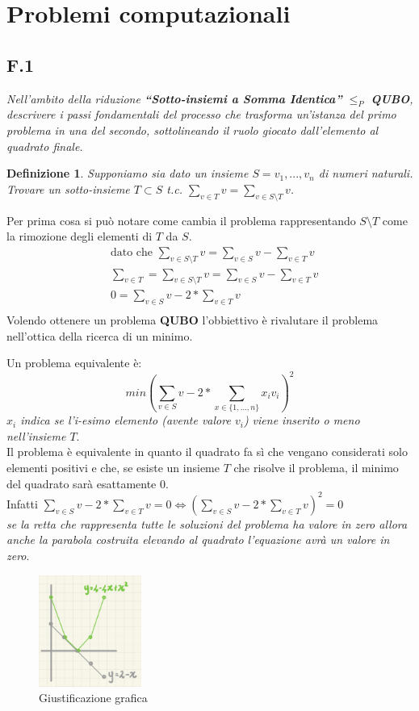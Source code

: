 \documentclass[a4paper]{article}
\newtheorem*{definition}{Definizione}
\begin{document}
\section{Problemi computazionali}
\subsection{F.1}
\label{SEC:F1}
\emph{Nell’ambito della riduzione \textbf{“Sotto-insiemi a Somma Identica”} $\leq_P$ \textbf{QUBO}, descrivere i passi fondamentali del processo che trasforma un’istanza del primo problema in una del secondo, sottolineando il ruolo giocato dall’elemento al quadrato finale.}

\begin{definition}
	Supponiamo sia dato un insieme $S = {v_1 , . . . , v_n }$ di numeri naturali. Trovare un sotto-insieme $T \subset S$ t.c.  $\sum_{v\in T} v = \sum_{v \in S \setminus T}v $.
\end{definition}
Per prima cosa si può notare come cambia il problema rappresentando $S \setminus T$ come la rimozione degli elementi di $T$ da $S$.
\begin{align*}
	 &\text{dato che }\sum_{v \in S \setminus T}v = \sum_{v\in S} v - \sum_{v\in T} v \\
	 &\sum_{v\in T} = \sum_{v \in S \setminus T}v = \sum_{v\in S} v - \sum_{v\in T} v \\
	 &0 = \sum_{v\in S} v - 2 * \sum_{v\in T} v \\
\end{align*}
Volendo ottenere un problema \textbf{QUBO} l'obbiettivo è rivalutare il problema nell'ottica della ricerca di un minimo.

Un problema equivalente è: $$ min(\sum_{v\in S} v - 2 * \sum_{x \in \{1,...,n\}} x_iv_i)^2$$ \textit{$x_i$ indica se l'i-esimo elemento (avente valore $v_i$) viene inserito o meno nell'insieme $T$}.\\
Il problema è equivalente in quanto il quadrato fa sì che vengano considerati solo elementi positivi e che, se esiste un insieme $T$ che risolve il problema, il minimo del quadrato sarà esattamente 0.\\
Infatti $\sum_{v\in S} v - 2 * \sum_{v\in T} v = 0 \Leftrightarrow (\sum_{v\in S} v - 2 * \sum_{v\in T} v)^2=0$\\
\textit{se la retta che rappresenta tutte le soluzioni del problema ha valore in zero allora anche la parabola costruita elevando al quadrato l'equazione avrà un valore in zero}.
\begin{figure}[!ht]
                \centering
                \includegraphics[width = 0.3\textwidth]{./img/F1.png}
                \caption{Giustificazione grafica} \label{FIG:F1}
\end{figure}
\restoregeometry
\end{document}
